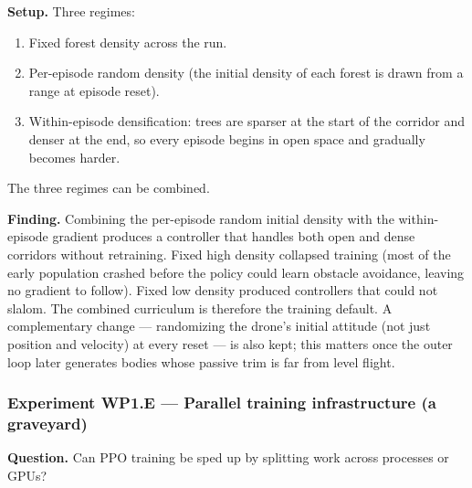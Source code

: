 \documentclass[letterpaper,10pt]{article}
\begin{document}
\textbf{Setup.} Three regimes:
\begin{enumerate}
    \item Fixed forest density across the run.
    \item Per-episode random density (the initial density of each forest is drawn from a range at episode reset).
    \item Within-episode densification: trees are sparser at the start of the corridor and denser at the end, so every episode begins in open space and gradually becomes harder.
\end{enumerate}
The three regimes can be combined.

\textbf{Finding.} Combining the per-episode random initial density with the within-episode gradient produces a controller that handles both open and dense corridors without retraining. Fixed high density collapsed training (most of the early population crashed before the policy could learn obstacle avoidance, leaving no gradient to follow). Fixed low density produced controllers that could not slalom. The combined curriculum is therefore the training default. A complementary change --- randomizing the drone's initial attitude (not just position and velocity) at every reset --- is also kept; this matters once the outer loop later generates bodies whose passive trim is far from level flight.

\subsubsection{Experiment WP1.E — Parallel training infrastructure (a graveyard)}
\textbf{Question.} Can PPO training be sped up by splitting work across processes or GPUs?
\end{document}
